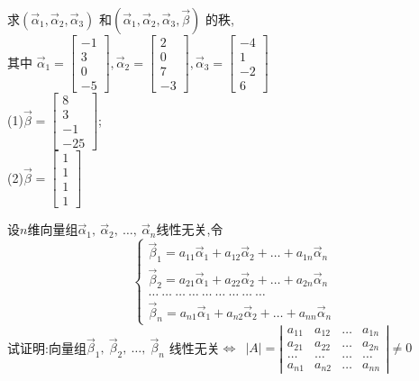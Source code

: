 \begin{ex}\label{4.8}
求$(\vec{\alpha}_1,\vec{\alpha}_2,\vec{\alpha}_3)$ 和$(\vec{\alpha}_1,\vec{\alpha}_2,\vec{\alpha}_3,\vec{\beta})$ 的秩,\\
其中
$\vec{\alpha}_1=\begin{bmatrix}-1\\3\\0\\-5\end{bmatrix},\vec{\alpha}_2=\begin{bmatrix}2\\0\\7\\-3\end{bmatrix},
\vec{\alpha}_3=\begin{bmatrix}-4\\1\\-2\\6\end{bmatrix}$\\
(1)$\vec{\beta}=\begin{bmatrix} 8\\3\\-1\\-25\end{bmatrix}$;\\
(2)$\vec{\beta}=\begin{bmatrix} 1\\1\\1\\1\end{bmatrix}$
\end{ex}

\begin{ex}\label{4.9}
设$n$维向量组$\vec{\alpha}_1, \ \vec{\alpha}_2, \ \dots,\ \vec{\alpha}_n$线性无关,令
\begin{displaymath}
\left\{\begin{aligned}\vec{\beta}_1=a_{11}\vec{\alpha}_1+a_{12}\vec{\alpha}_2+\dots+a_{1n}\vec{\alpha}_n \\ \vec{\beta}_2=a_{21}\vec{\alpha}_1+a_{22}\vec{\alpha}_2+\dots+a_{2n}\vec{\alpha}_n \\ \dots \ \dots \ \dots
\ \dots \ \dots \ \dots  \ \dots \ \dots   \ \dots   \\ \vec{\beta}_n=a_{n1}\vec{\alpha}_1+a_{n2}\vec{\alpha}_2+\dots+a_{nn}\vec{\alpha}_n\end{aligned}\right.
\end{displaymath}
试证明:向量组$\vec{\beta}_1,\ \vec{\beta}_2,\ \dots,\ \vec{\beta}_n$ 线性无关$\Leftrightarrow$\ $|A|=\left|\begin{array}{cccc}a_{11}&a_{12}&\dots&a_{1n}
\\a_{21}&a_{22}&\dots&a_{2n}\\ \dots&\dots&\dots&\dots\\a_{n1}&a_{n2}&\dots&a_{nn}\end{array}\right|\not=0$
\end{ex}

